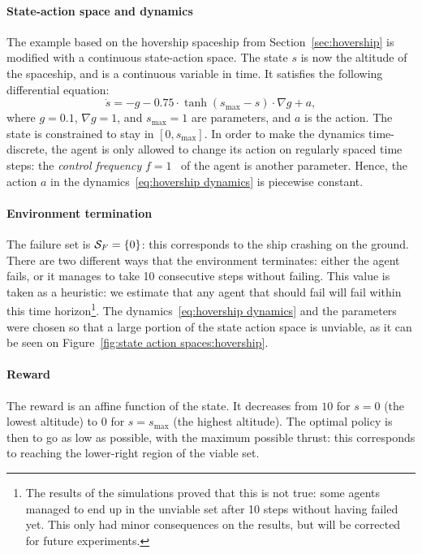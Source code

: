 \paragraph{State-action space and dynamics} The example based on the hovership spaceship from Section~\ref{sec:hovership} is modified with a continuous state-action space. The state $s$ is now the altitude of the spaceship, and is a continuous variable in time. It satisfies the following differential equation:
\begin{equation}
	\dot{s} =- g - 0.75\cdot\tanh\left(s_\text{max} - s\right)\cdot\nabla g + a, \label{eq:hovership dynamics}
\end{equation}
where $g=0.1$, $\nabla g = 1$, and $s_\text{max} = 1$ are parameters, and $a$ is the action. The state is constrained to stay in $[0, s_\text{max}]$. In order to make the dynamics time-discrete, the agent is only allowed to change its action on regularly spaced time steps: the\emph{ control frequency} $f = 1$ \hertz~of the agent is another parameter. Hence, the action $a$ in the dynamics~\eqref{eq:hovership dynamics} is piecewise constant.

\paragraph{Environment termination} The failure set is ${\mathcal{S}_{F}} = \{0\}$: this corresponds to the ship crashing on the ground. There are two different ways that the environment terminates: either the agent fails, or it manages to take 10 consecutive steps without failing. This value is taken as a heuristic: we estimate that any agent that should fail will fail within this time horizon\footnote{The results of the simulations proved that this is not true: some agents managed to end up in the unviable set after 10 steps without having failed yet. This only had minor consequences on the results, but will be corrected for future experiments.}. The dynamics~\eqref{eq:hovership dynamics} and the parameters were chosen so that a large portion of the state action space is unviable, as it can be seen on Figure~\ref{fig:state action spaces:hovership}.

\paragraph{Reward} The reward is an affine function of the state. It decreases from $10$ for $s=0$ (the lowest altitude) to $0$ for $s=s_\text{max}$ (the highest altitude). The optimal policy is then to go as low as possible, with the maximum possible thrust: this corresponds to reaching the lower-right region of the viable set.

